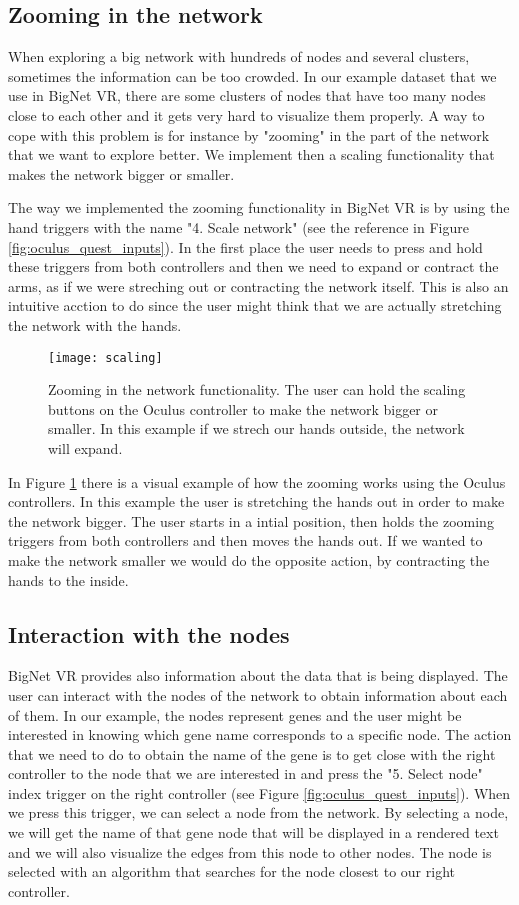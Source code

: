 \subsection{Zooming in the network}
When exploring a big network with hundreds of nodes and several clusters, sometimes the information can be too crowded. In our example dataset that we use in BigNet VR, there are some clusters of nodes that have too many nodes close to each other and it gets very hard to visualize them properly. A way to cope with this problem is for instance by "zooming" in the part of the network that we want to explore better. We implement then a scaling functionality that makes the network bigger or smaller.

The way we implemented the zooming functionality in BigNet VR is by using the hand triggers with the name "4. Scale network" (see the reference in Figure \ref{fig:oculus_quest_inputs}). In the first place the user needs to press and hold these triggers from both controllers and then we need to expand or contract the arms, as if we were streching out or contracting the network itself. This is also an intuitive acction to do since the user might think that we are actually stretching the network with the hands.

\begin{figure}[h!]
    \centering%
    \texttt{[image: scaling]}
    \caption{Zooming in the network functionality. The user can hold the scaling buttons on the Oculus controller to make the network bigger or smaller. In this example if we strech our hands outside, the network will expand.}
    \label{fig:scaling}
\end{figure}%


In Figure \ref{fig:scaling} there is a visual example of how the zooming works using the Oculus controllers. In this example the user is stretching the hands out in order to make the network bigger. The user starts in a intial position, then holds the zooming triggers from both controllers and then moves the hands out. If we wanted to make the network smaller we would do the opposite action, by contracting the hands to the inside.

\subsection{Interaction with the nodes}
BigNet VR provides also information about the data that is being displayed. The user can interact with the nodes of the network to obtain information about each of them. In our example, the nodes represent genes and the user might be interested in knowing which gene name corresponds to a specific node. The action that we need to do to obtain the name of the gene is to get close with the right controller to the node that we are interested in and press the "5. Select node" index trigger on the right controller (see Figure \ref{fig:oculus_quest_inputs}). When we press this trigger, we can select a node from the network. By selecting a node, we will get the name of that gene node that will be displayed in a rendered text and we will also visualize the edges from this node to other nodes. The node is selected with an algorithm that searches for the node closest to our right controller.

